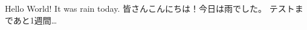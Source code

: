\documentclass{jlreq}
\begin{document}
  Hello World! It was rain today.
  皆さんこんにちは！今日は雨でした。
  テストまであと1週間…
\end{document}
